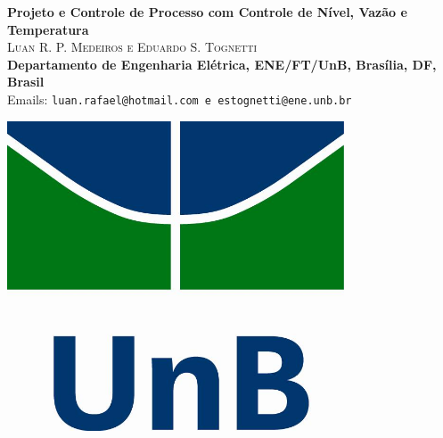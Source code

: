 \documentclass[a0,portrait]{a0poster}
\begin{document}


\begin{minipage}[b]{0.75\linewidth}
{\centering
\fontsize{90}{120} \color{NavyBlue} \textbf{Projeto e Controle  de Processo com Controle de Nível, Vazão e Temperatura} \color{Black}\\[1.5cm] %

\huge \textsc{Luan R. P. Medeiros e Eduardo S. Tognetti}\\[0.5cm] %

\Large{\bf Departamento de Engenharia Elétrica, ENE/FT/UnB, Brasília, DF, Brasil}\\[0.5cm]
\Large Emails: \texttt{luan.rafael@hotmail.com e estognetti@ene.unb.br}\\
}
\end{minipage}
%
\begin{minipage}[b]{0.25\linewidth}
\includegraphics[width=10cm]{logo.png}\\
\end{minipage}
\end{document}
